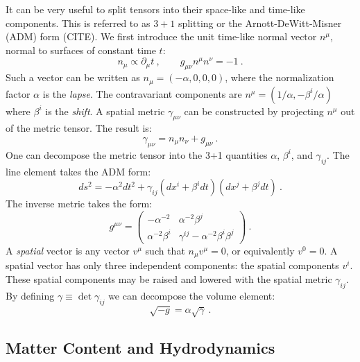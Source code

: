    It can be very useful to split tensors into their space-like and time-like components.  This is referred to as $3+1$ splitting or the Arnott-DeWitt-Misner (ADM) form  (CITE).  We first introduce the unit time-like normal vector $n^\mu$, normal to surfaces of constant time $t$:
   \begin{equation}
   	n_\mu \propto \partial_\mu t\ , \qquad g_{\mu\nu}n^\mu n^\nu = -1\ .
   \end{equation}
   Such a vector can be written as $n_\mu = (-\alpha, 0, 0, 0)$, where the normalization factor $\alpha$ is the \emph{lapse}.  The contravariant components are $n^\mu = (1/\alpha, -\beta^i/\alpha)$ where $\beta^i$ is the \emph{shift}.  A spatial metric $\gamma_{\mu\nu}$ can be constructed by projecting $n^\mu$ out of the metric tensor.  The result is:
   \begin{equation}
   	\gamma_{\mu\nu} = n_\mu n_\nu + g_{\mu\nu}\ .
   \end{equation}
   One can decompose the metric tensor into the 3+1 quantities $\alpha$, $\beta^i$, and $\gamma_{ij}$.  The line element takes the ADM form:
   \begin{equation}
   	ds^2 = -\alpha^2 dt^2 + \gamma_{ij}\left(dx^i + \beta^idt\right)\left(dx^j + \beta^jdt\right)\ .
   \end{equation}
   The inverse metric takes the form:
   \begin{equation}
   	g^{\mu\nu} = \begin{pmatrix} -\alpha^{-2} & \alpha^{-2}\beta^j \\
							\alpha^{-2}\beta^i & \gamma^{ij} - \alpha^{-2}\beta^i \beta^j \end{pmatrix}\ .
   \end{equation}
   A \emph{spatial} vector is any vector $v^\mu$ such that $n_\mu v^\mu = 0$, or equivalently $v^0 = 0$.  A spatial vector has only three independent components: the spatial components $v^i$.  These spatial components may be raised and lowered with the spatial metric $\gamma_{ij}$.  By defining $\gamma \equiv \det \gamma_{ij}$ we can decompose the volume element:
   \begin{equation}
   	\sqrt{-g} = \alpha \sqrt{\gamma} \ .
   \end{equation}
   
\subsection{Matter Content and Hydrodynamics}

